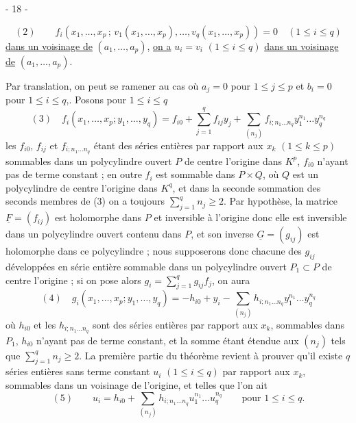 \begin{center}
- 18 -
\end{center}
\[
(2)\qquad f_i(x_1,\ldots,x_p\,;\,v_1(x_1,\ldots,x_p),\ldots,v_q(x_1,\ldots,x_p))=0
\quad(1\leq i\leq q)
\]
\uline{dans un voisinage de} $(a_1,\ldots,a_p)$, \uline{on a}
$u_i=v_i$ $(1\leq i\leq q)$ \uline{dans un voisinage de}
$(a_1,\ldots,a_p)$.

Par translation, on peut se ramener au cas où $a_j=0$ pour $1\leq j\leq p$
et $b_i=0$ pour $1\leq i\leq q$,. Posons pour $1\leq i\leq q$
\[
(3)\quad
f_i(x_1,\ldots,x_p;y_1,\ldots,y_q)
=f_{i0}+\sum_{j=1}^q f_{ij}y_j
+\sum_{(n_j)}f_{i;n_1\ldots n_q}y_1^{n_1}\ldots y_q^{n_q}
\]
les $f_{i0}$, $f_{ij}$ et $f_{i;n_1\ldots n_q}$ étant des séries entières par
rapport aux $x_k$ $(1\leq k\leq p)$ sommables dans un polycylindre ouvert $P$
de centre l'origine dans $K^p$, $f_{i0}$ n'ayant pas de terme constant ;
en outre $f_i$ est sommable dans $P\times Q$, où $Q$ est un polycylindre de centre
l'origine dans $K^q$, et dans la seconde sommation des seconds membres de (3)
on a toujours $\sum_{j=1}^q n_j\geq2$.
Par hypothèse, la matrice $\underline F=(f_{ij})$ est holomorphe dans $P$ et
inversible à l'origine donc elle est inversible dans un polycylindre ouvert
contenu dans $P$, et son inverse $\underline G=(g_{ij})$ est holomorphe dans ce
polycylindre ; nous supposerons donc chacune des $g_{ij}$ développées en série
entière sommable dans un polycylindre ouvert $P_1\subset P$ de centre l'origine ;
si on pose alors $g_i=\sum_{j=1}^q g_{ij}f_j$, on aura
\[
(4)\quad
g_i(x_1,\ldots,x_p;y_1,\ldots,y_q)
=-h_{i0}+y_i-\sum_{(n_j)}h_{i;n_1\ldots n_q}y_1^{n_1}\ldots y_q^{n_q}
\]
où $h_{i0}$ et les $h_{i;n_1\ldots n_q}$ sont des séries entières par rapport
aux $x_k$, sommables dans $P_1$, $h_{i0}$ n'ayant pas de terme constant, et la
somme étant étendue aux $(n_j)$ tels que $\sum_{j=1}^q n_j\geq2$.
La première partie du théorème revient à prouver qu'il existe $q$ séries entières
sans terme constant $u_i$ $(1\leq i\leq q)$ par rapport aux $x_k$, sommables dans
un voisinage de l'origine, et telles que l'on ait
\[
(5)\qquad
u_i=h_{i0}+\sum_{(n_j)}h_{i;n_1\ldots n_q}u_1^{n_1}\ldots u_q^{n_q}
\qquad\text{pour }1\leq i\leq q.
\]
